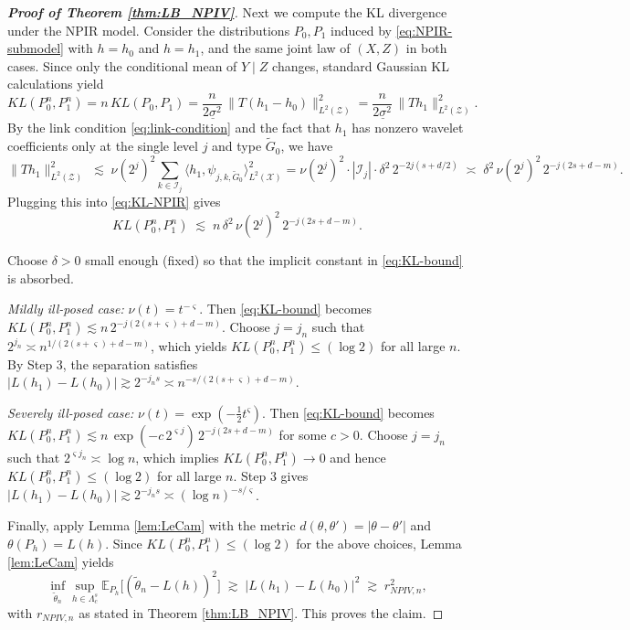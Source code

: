 \documentclass[12pt,american]{article}
\theoremstyle{definition}
\theoremstyle{plain}
\theoremstyle{definition}
\theoremstyle{plain}
\theoremstyle{plain}
\theoremstyle{plain}
\theoremstyle{plain}
\theoremstyle{plain}
\newcommand{\E}{\mathbb{E}}
\begin{document}
\begin{proof}[\textbf{Proof of Theorem \ref{thm:LB_NPIV}}]
Next we compute the KL divergence under the NPIR model.
Consider the distributions $P_0,P_1$ induced by \eqref{eq:NPIR-submodel} with $h=h_0$ and $h=h_1$,
and the same joint law of $(X,Z)$ in both cases. Since only the conditional mean of $Y\mid Z$ changes,
standard Gaussian KL calculations yield
\begin{equation}\label{eq:KL-NPIR}
KL(P_0^n,P_1^n)=n\,KL(P_0,P_1)
=\frac{n}{2\underline\sigma^2}\,\|T(h_1-h_0)\|_{L^2(\mathcal Z)}^2
=\frac{n}{2\underline\sigma^2}\,\|Th_1\|_{L^2(\mathcal Z)}^2.
\end{equation}
By the link condition \eqref{eq:link-condition} and the fact that $h_1$ has nonzero wavelet coefficients
only at the single level $j$ and type $\tilde G_0$, we have
\[
\|Th_1\|_{L^2(\mathcal Z)}^2
\;\lesssim\;
\nu(2^{j})^2 \sum_{k\in\mathcal I_j}\bigl\langle h_1,\psi_{j,k,\tilde G_0}\bigr\rangle_{L^2(\mathcal X)}^2
=
\nu(2^{j})^2\cdot |\mathcal I_j|\cdot \delta^2\,2^{-2j(s+d/2)}
\;\asymp\;
\delta^2\,\nu(2^{j})^2\,2^{-j(2s+d-m)}.
\]
Plugging this into \eqref{eq:KL-NPIR} gives
\begin{equation}\label{eq:KL-bound}
KL(P_0^n,P_1^n)\;\lesssim\; n\,\delta^2\,\nu(2^{j})^2\,2^{-j(2s+d-m)}.
\end{equation}

Choose $\delta>0$ small enough (fixed) so that the implicit constant in \eqref{eq:KL-bound} is absorbed.

\emph{Mildly ill-posed case:} $\nu(t)=t^{-\varsigma}$.
Then \eqref{eq:KL-bound} becomes $KL(P_0^n,P_1^n)\lesssim n\,2^{-j(2(s+\varsigma)+d-m)}$.
Choose $j=j_n$ such that $2^{j_n}\asymp n^{1/(2(s+\varsigma)+d-m)}$, which yields
$KL(P_0^n,P_1^n)\le (\log 2)$ for all large $n$.
By Step 3, the separation satisfies $|L(h_1)-L(h_0)|\gtrsim 2^{-j_n s}\asymp n^{-s/(2(s+\varsigma)+d-m)}$.

\emph{Severely ill-posed case:} $\nu(t)=\exp(-\tfrac12 t^\varsigma)$.
Then \eqref{eq:KL-bound} becomes
$KL(P_0^n,P_1^n)\lesssim n\,\exp(-c\,2^{\varsigma j})\,2^{-j(2s+d-m)}$ for some $c>0$.
Choose $j=j_n$ such that $2^{\varsigma j_n}\asymp \log n$, which implies $KL(P_0^n,P_1^n)\to 0$ and hence
$KL(P_0^n,P_1^n)\le (\log 2)$ for all large $n$.
Step 3 gives $|L(h_1)-L(h_0)|\gtrsim 2^{-j_n s}\asymp (\log n)^{-s/\varsigma}$.

Finally, apply Lemma \ref{lem:LeCam} with the metric $d(\theta,\theta')=|\theta-\theta'|$ and
$\theta(P_h)=L(h)$.
Since $KL(P_0^n,P_1^n)\le (\log 2)$ for the above choices, Lemma \ref{lem:LeCam} yields
\[
\inf_{\tilde\theta_n}\sup_{h\in\Lambda_c^s}\E_{P_h}\bigl[(\tilde\theta_n-L(h))^2\bigr]
\;\gtrsim\;
|L(h_1)-L(h_0)|^2
\;\gtrsim\;
r_{NPIV,n}^2,
\]
with $r_{NPIV,n}$ as stated in Theorem \ref{thm:LB_NPIV}.
This proves the claim.
\end{proof}
\end{document}
